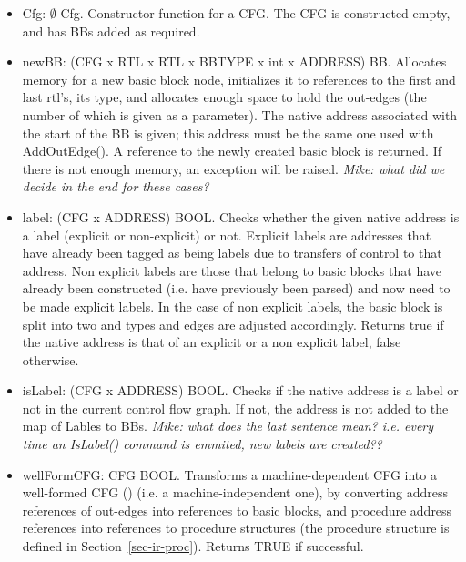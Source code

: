 \begin{itemize}
\item Cfg: $\emptyset$ \ra Cfg.
    Constructor function for a CFG. The CFG is constructed empty, and
    has BBs added as required.

\item newBB: (CFG x RTL x RTL x BBTYPE x int x ADDRESS) \ra BB.  
    Allocates memory for a new basic block node, initializes it to 
    references to the first and last rtl's, its type, and allocates 
    enough space to hold the out-edges (the number of which is 
    given as a parameter).  
    The native address associated with the start of the BB is given;
    this address must be the same one used with AddOutEdge().
    A reference to the newly created basic block is returned.
    If there is not enough memory, an exception will be raised.
    \emph{Mike: what did we decide in the end for these cases?}

\item label: (CFG x ADDRESS) \ra BOOL.
    Checks whether the given native address is a label (explicit or 
    non-explicit) or not.  Explicit labels are addresses that have already 
    been tagged as being labels due to transfers of control to that 
    address.  Non explicit labels are those that belong to basic blocks 
    that have already been constructed (i.e. have previously been 
    parsed) and now need to be made explicit labels.  In the case of 
    non explicit labels, the basic block is split into two and types 
    and edges are adjusted accordingly.
    Returns true if the native address is that of an explicit or a non 
    explicit label, false otherwise. 

\item isLabel: (CFG x ADDRESS) \ra BOOL.
    Checks if the native address is a label or not in the current 
    control flow graph. 
    If not, the address is not added to the map of Lables to BBs.
    \emph{Mike: what does the last sentence mean?  i.e. every time
    an IsLabel() command is emmited, new labels are created??}

\item wellFormCFG: CFG \ra BOOL.  
    Transforms a machine-dependent CFG into a well-formed CFG (\wfCFG) 
    (i.e. a machine-independent one), by converting address references 
    of out-edges into references to basic blocks, and procedure
    address references into references to procedure structures 
    (the procedure structure is defined in Section~\ref{sec-ir-proc}).  
    Returns TRUE if successful.


\end{itemize}
